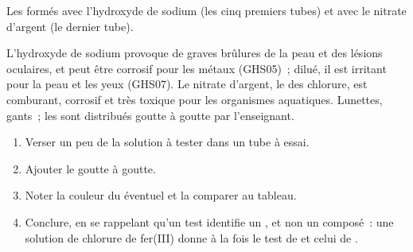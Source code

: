 \begin{omfigure}

{\small Les  formés avec l'hydroxyde de sodium (les cinq
premiers tubes) et avec le nitrate d'argent (le dernier tube).}
\end{omfigure}

\begin{safety}{}
L'hydroxyde de sodium provoque de graves brûlures de la peau et des
lésions oculaires, et peut être corrosif pour les métaux (GHS05)~; dilué,
il est irritant pour la peau et les yeux (GHS07). Le nitrate d'argent,
le  des  chlorure, est comburant, corrosif et très toxique
pour les organismes aquatiques. Lunettes, gants~; les  sont
distribués goutte à goutte par l'enseignant.
\end{safety}

\begin{method}\label{met:g9:ions:test}
\begin{enumerate}
  \item Verser un peu de la solution à tester dans un tube à essai.
  \item Ajouter le  goutte à goutte.
  \item Noter la couleur du  éventuel et la comparer au
        tableau.
  \item Conclure, en se rappelant qu'un test identifie un , et non un
        composé~: une solution de chlorure de fer(III) donne à la fois le
        test de  et celui de .
\end{enumerate}
\end{method}


